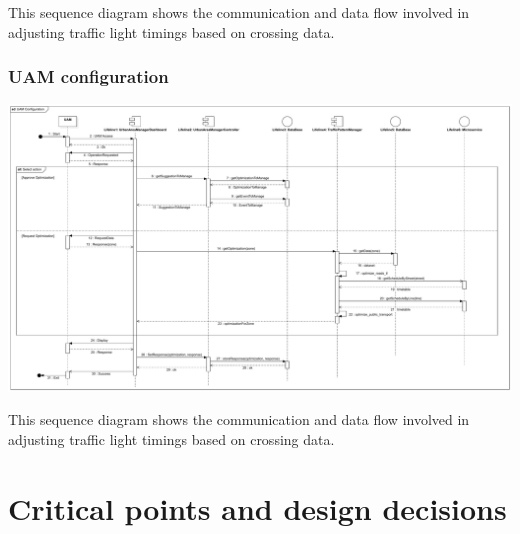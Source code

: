 \documentclass[12pt, a4paper, twoside, openright]{report}
\begin{document}
This sequence diagram shows the communication and data flow involved in
adjusting traffic light timings based on crossing data.


\subsubsection{UAM configuration}

\includegraphics[width=\linewidth]{images/svg/uam_configuration.pdf}

This sequence diagram shows the communication and data flow involved in
adjusting traffic light timings based on crossing data.


\section{Critical points and design decisions}

\end{document}
